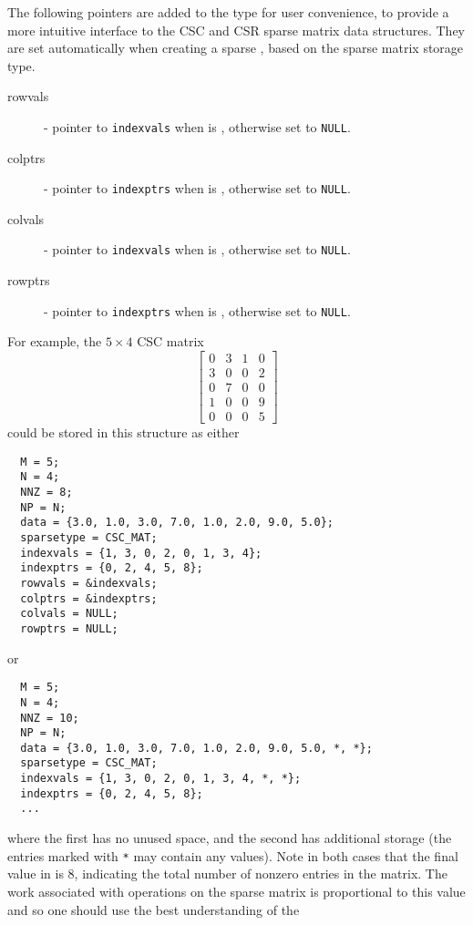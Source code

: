 \noindent The following pointers are added to the  type for
  user convenience, to provide a more intuitive interface to the CSC
  and CSR sparse matrix data structures. They are set automatically
  when creating a sparse {\sunmatrix}, based on the sparse matrix storage
  type.  
\begin{description}
  \item[rowvals] - pointer to \verb|indexvals| when  is ,
    otherwise set to \verb|NULL|.
  \item[colptrs] - pointer to \verb|indexptrs| when  is ,
    otherwise set to \verb|NULL|.
  \item[colvals] - pointer to \verb|indexvals| when  is ,
    otherwise set to \verb|NULL|.
  \item[rowptrs] - pointer to \verb|indexptrs| when  is ,
    otherwise set to \verb|NULL|.
\end{description}
For example, the $5\times 4$ CSC matrix
\[
  \left[\begin{array}{cccc} 
     0 & 3 & 1 & 0\\
     3 & 0 & 0 & 2\\
     0 & 7 & 0 & 0\\
     1 & 0 & 0 & 9\\
     0 & 0 & 0 & 5
  \end{array}\right]
\]
could be stored in this structure as either
\begin{verbatim}
  M = 5;
  N = 4;
  NNZ = 8;
  NP = N;
  data = {3.0, 1.0, 3.0, 7.0, 1.0, 2.0, 9.0, 5.0};
  sparsetype = CSC_MAT;
  indexvals = {1, 3, 0, 2, 0, 1, 3, 4};
  indexptrs = {0, 2, 4, 5, 8};
  rowvals = &indexvals;
  colptrs = &indexptrs;
  colvals = NULL;
  rowptrs = NULL;
\end{verbatim}
or 
\begin{verbatim}
  M = 5;
  N = 4;
  NNZ = 10;
  NP = N;
  data = {3.0, 1.0, 3.0, 7.0, 1.0, 2.0, 9.0, 5.0, *, *};
  sparsetype = CSC_MAT;
  indexvals = {1, 3, 0, 2, 0, 1, 3, 4, *, *};
  indexptrs = {0, 2, 4, 5, 8};
  ...
\end{verbatim}
where the first has no unused space, and the second has additional
storage (the entries marked with \texttt{*} may contain any values).
Note in both cases that the final value in  is $8$,
indicating the total number of nonzero entries in the matrix.  The
work associated with operations on the sparse matrix is proportional
to this value and so one should use the best understanding of the
